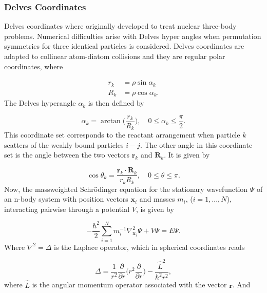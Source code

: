 \documentclass{article}
\numberwithin{equation}{section}
\numberwithin{figure}{section}
\begin{document}
\subsubsection{Delves Coordinates}
Delves coordinates where originally developed to treat nuclear three-body problems. Numerical difficulties arise with Delves hyper angles when permutation symmetries for three identical particles is considered. Delves coordinates are adapted to collinear atom-diatom collisions and they are regular polar coordinates, where

\begin{subequations}
	\begin{align}
		r_{k} &= \rho \sin{\alpha_{k}}\\
		R_{k} &= \rho \cos{\alpha_{k}}.
	\end{align}
\end{subequations}
The Delves hyperangle $\alpha_{k}$ is then defined by

\begin{equation}
	\alpha_{k} = \arctan\bigg(\frac{r_{k}}{R_{k}}\bigg), \quad 0\leq \alpha_{k} \leq \frac{\pi}{2}.
\end{equation}
This coordinate set corresponds to the reactant arrangement when particle $k$ scatters of the weakly bound particles $i-j$. The other angle in this coordinate set is the angle between the two vectors $\mathbf{r}_{k}$ and $\mathbf{R}_{k}$. It is given by

\begin{equation}
\cos{\theta_{k}} = \frac{\mathbf{r}_{k} \cdot \mathbf{R}_{k}}{r_{k} R_{k}}, \quad  0\leq \theta \leq \pi.
\end{equation}
Now, the massweighted Schr{\"o}dinger equation for the stationary wavefunction $\Psi$ of an n-body system with position vectors $\mathbf{x}_i$ and masses $m_i$, ($i=1,...,N$), interacting pairwise through a potential $V$, is given by

\begin{equation}
-\frac{\hbar^2}{2} \sum_{i=1}^{N} m^{-1}_{i} \nabla^{2}_{\mathbf{x}_{i}} \Psi + V\Psi = E \Psi. 
\end{equation}
Where $\nabla^{2}=\Delta$ is the Laplace operator, which in spherical coordinates reads

\begin{equation}
\Delta = \frac{1}{r^{2}}\frac{\partial}{\partial r} \bigg(r^{2} \frac{\partial}{\partial r}\bigg) - \frac{\hat{L}^{2}}{\hbar^2 r^{2}},
\end{equation}
where $\hat{L}$ is the angular momentum operator associated with the vector $\mathbf{r}$. And
\end{document}
